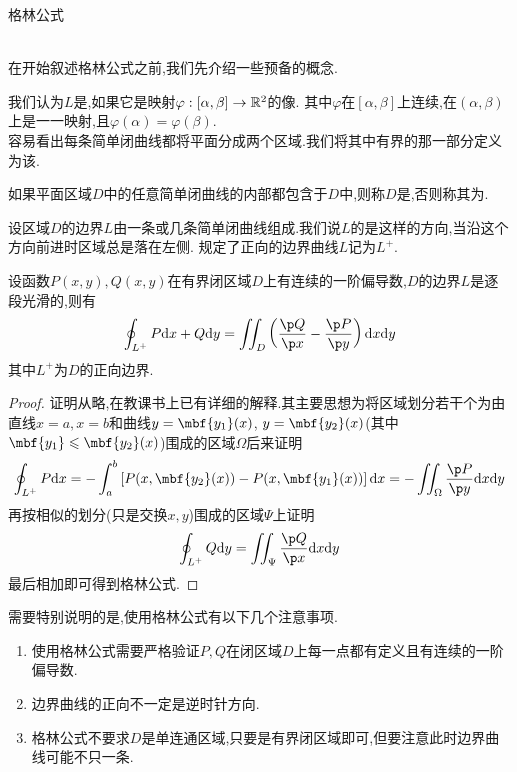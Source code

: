 \documentclass{ctexart}
\begin{document}
\pagestyle{empty}
\begin{center}\large 格林公式\end{center}
\\
在开始叙述格林公式之前,我们先介绍一些预备的概念.
\begin{definition}[1.1 定义:简单闭曲线]
    我们认为$L$是,如果它是映射$\varphi:[\alpha,\beta]\to\mathbb{R}^2$的像.%
    其中$\varphi$在$[\alpha,\beta]$上连续,在$(\alpha,\beta)$上是一一映射,且$\varphi(\alpha)=\varphi(\beta)$.\\
    容易看出每条简单闭曲线都将平面分成两个区域.我们将其中有界的那一部分定义为该.
\end{definition}
\begin{definition}[1.2 定义:单连通区域和多连通区域]
    如果平面区域$D$中的任意简单闭曲线的内部都包含于$D$中,则称$D$是,否则称其为.
\end{definition}
\begin{definition}[1.3 定义:边界曲线的正向]
    设区域$D$的边界$L$由一条或几条简单闭曲线组成.我们说$L$的是这样的方向,当沿这个方向前进时区域总是落在左侧.%
    规定了正向的边界曲线$L$记为$L^+$.
\end{definition}\noindent
{}
\begin{formal}[2.1 格林公式]
    设函数$P(x,y),Q(x,y)$在有界闭区域$D$上有连续的一阶偏导数,$D$的边界$L$是逐段光滑的,则有
    \[\oint_{L^+}P\di x+Q\di y=\iint_D\left(\dfrac{\p Q}{\p x}-\dfrac{\p P}{\p y}\right)\dx\di y\]
    其中$L^+$为$D$的正向边界.
\end{formal}\noindent
\begin{proof}
    证明从略,在教课书上已有详细的解释.其主要思想为将区域划分若干个为由直线$x=a,x=b$和曲线$y=\mbf{y_1}(x)$,%
    $y=\mbf{y_2}(x)$(其中$\mbf{y_1}\leqslant\mbf{y_2}(x)$)围成的区域$\Omega$后来证明
    \[\oint_{L^+}P\di x=-\int_a^b\left[P(x,\mbf{y_2}(x))-P(x,\mbf{y_1}(x))\right]\di x=-\iint_{\Omega}\dfrac{\p P}{\p y}\dx\di y\]
    再按相似的划分(只是交换$x,y$)围成的区域$\Psi$上证明
    \[\oint_{L^+}Q\di y=\iint_{\Psi}\dfrac{\p Q}{\p x}\dx\di y\]
    最后相加即可得到格林公式.
\end{proof}\noindent
需要特别说明的是,使用格林公式有以下几个注意事项.
\begin{theorem}[2.2 使用格林公式的注意事项]
    \begin{enumerate}[label=\tbf{(\arabic*)}]
        \item 使用格林公式需要严格验证$P,Q$在闭区域$D$上每一点都有定义且有连续的一阶偏导数.
        \item 边界曲线的正向不一定是逆时针方向.
        \item 格林公式不要求$D$是单连通区域,只要是有界闭区域即可,但要注意此时边界曲线可能不只一条.
    \end{enumerate}
\end{theorem}\noindent
\end{document}
